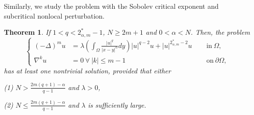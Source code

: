 \documentclass[reqno]{amsart}
\newtheorem{theorem}{Theorem}
\newcommand{\DD} {\displaystyle}
\newcommand{\la} {\lambda}
\newcommand{\Om}{\Omega}
\newcommand{\al} {\alpha}
\newcommand{\noi} {  \noindent}
\numberwithin{theorem}{section} \numberwithin{equation}{section}
\begin{document}
\noi Similarly, we study the problem with the Sobolev critical exponent and subcritical nonlocal perturbation.
\begin{theorem}\label{t3}
If $1<q<{2_{\al, m}^*}-1$, $N\geq2m+1$ and $0<\al<N$. Then, the problem 
\begin{equation*}%
\left\{
\begin{aligned}
(-\Delta)^m u&=\la\left(\DD\int_{\Om} \frac{|u|^q}{|x-y|^\al} d y\right)|u|^{q-2} u+|u|^{2_{\al, m}^*-2} u \,&& \text{ in}\ \Om, \\
\nabla^k u&=0\  \forall \ |k|\leq m-1 \,&& \text { on}\ \partial\Om, 
\end{aligned}\right.
\end{equation*}
has at least one nontrivial solution, provided that either
\item (1) $N>\frac{2m(q+1)-\al}{q-1}$ and $\la>0$,
\item (2) $N \leq \frac{2m(q+1)-\al}{q-1}$ and $\la$ is sufficiently large.
\end{theorem}
\end{document}
